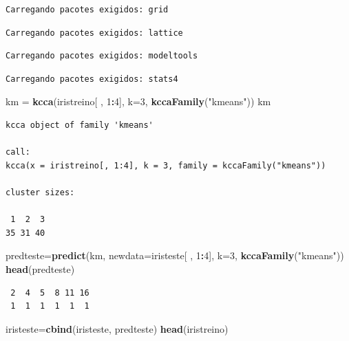 \documentclass[12pt,brazil,oneside]{book}
\newenvironment{Shaded}{\begin{snugshade}}{\end{snugshade}}
\newcommand{\DataTypeTok}[1]{\textcolor[rgb]{0.13,0.29,0.53}{#1}}
\newcommand{\DecValTok}[1]{\textcolor[rgb]{0.00,0.00,0.81}{#1}}
\newcommand{\KeywordTok}[1]{\textcolor[rgb]{0.13,0.29,0.53}{\textbf{#1}}}
\newcommand{\NormalTok}[1]{#1}
\newcommand{\OperatorTok}[1]{\textcolor[rgb]{0.81,0.36,0.00}{\textbf{#1}}}
\newcommand{\StringTok}[1]{\textcolor[rgb]{0.31,0.60,0.02}{#1}}
\begin{document}
\begin{verbatim}
Carregando pacotes exigidos: grid
\end{verbatim}

\begin{verbatim}
Carregando pacotes exigidos: lattice
\end{verbatim}

\begin{verbatim}
Carregando pacotes exigidos: modeltools
\end{verbatim}

\begin{verbatim}
Carregando pacotes exigidos: stats4
\end{verbatim}

\begin{Shaded}
\begin{Highlighting}[]
\NormalTok{km =}\StringTok{ }\KeywordTok{kcca}\NormalTok{(iristreino[ , }\DecValTok{1}\OperatorTok{:}\DecValTok{4}\NormalTok{], }\DataTypeTok{k=}\DecValTok{3}\NormalTok{, }\KeywordTok{kccaFamily}\NormalTok{(}\StringTok{"kmeans"}\NormalTok{))}
\NormalTok{km}
\end{Highlighting}
\end{Shaded}

\begin{verbatim}
kcca object of family 'kmeans' 

call:
kcca(x = iristreino[, 1:4], k = 3, family = kccaFamily("kmeans"))

cluster sizes:

 1  2  3 
35 31 40 
\end{verbatim}

\begin{Shaded}
\begin{Highlighting}[]
\NormalTok{predteste=}\KeywordTok{predict}\NormalTok{(km, }\DataTypeTok{newdata=}\NormalTok{iristeste[ , }\DecValTok{1}\OperatorTok{:}\DecValTok{4}\NormalTok{], }\DataTypeTok{k=}\DecValTok{3}\NormalTok{, }\KeywordTok{kccaFamily}\NormalTok{(}\StringTok{"kmeans"}\NormalTok{))}
\KeywordTok{head}\NormalTok{(predteste)}
\end{Highlighting}
\end{Shaded}

\begin{verbatim}
 2  4  5  8 11 16 
 1  1  1  1  1  1 
\end{verbatim}

\begin{Shaded}
\begin{Highlighting}[]
\NormalTok{iristeste=}\KeywordTok{cbind}\NormalTok{(iristeste, predteste)}
\KeywordTok{head}\NormalTok{(iristreino)}
\end{Highlighting}
\end{Shaded}
\end{document}
